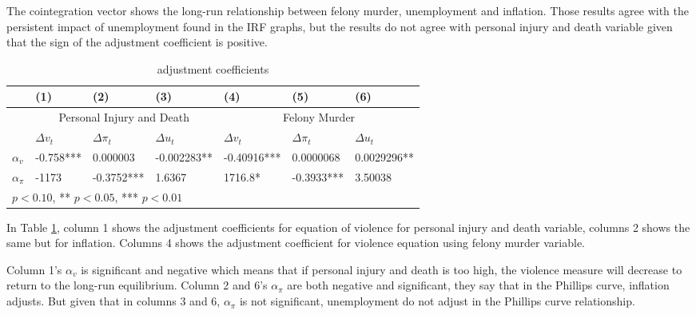 \documentclass[11pt, a4paper]{article}
\begin{document}
The cointegration vector shows the long-run relationship between felony murder, unemployment and inflation. Those results agree with the persistent impact of unemployment found in the IRF graphs, but the results do not agree with personal injury and death variable given that the sign of the adjustment coefficient is positive.


\begin{table}[H]
\centering 
\caption{adjustment coefficients}
\label{tab:adjustment}
\begin{tabular}{l| l l l |l l l  }\hline\hline 
 & (1)&(2) & (3)& (4)&(5) & (6)\\ \hline
 & \multicolumn{3}{c}{Personal Injury and Death} & \multicolumn{3}{c}{ Felony Murder}\\
 & $ \Delta v_t $  &  $ \Delta \pi_t $ &  $\Delta u_t$ & $ \Delta v_t $  &  $ \Delta \pi_t $ &  $\Delta u_t$ \\ 
$\alpha_v$ & -0.758*** & 0.000003 & -0.002283**  &  -0.40916*** & 0.0000068  & 0.0029296** \\
$\alpha_\pi$ & -1173 &  -0.3752***  &1.6367  & 1716.8* & -0.3933***  & 3.50038 \\
\hline\hline
\multicolumn{4}{l}{\footnotesize *  $p < 0.10$, **  $p < 0.05$, ***  $p < 0.01$}\\
\end{tabular}
\end{table}

In Table \ref{tab:adjustment}, column 1 shows the adjustment coefficients for equation of violence for personal injury and death variable, columns 2 shows the same but for inflation. Columns 4 shows the adjustment coefficient for violence equation using felony murder variable. 

Column 1's $\alpha_v$ is significant and negative which means that if personal injury and death is too high, the violence measure will decrease to return to the long-run equilibrium. Column 2 and 6's $\alpha_\pi $ are both negative and significant, they say that in the Phillips curve, inflation adjusts. But given that in columns 3 and 6, $\alpha_\pi$ is not significant, unemployment do not adjust in the Phillips curve relationship. 
\end{document}
